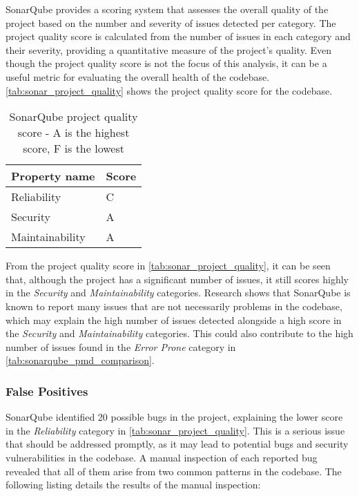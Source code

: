SonarQube provides a scoring system that assesses the overall quality of the project based on the number and severity of issues detected per category. The project quality score is calculated from the number of issues in each category and their severity, providing a quantitative measure of the project's quality. Even though the project quality score is not the focus of this analysis, it can be a useful metric for evaluating the overall health of the codebase. \autoref{tab:sonar_project_quality} shows the project quality score for the codebase.

\begin{table}[H]
	\label{tab:sonar_project_quality}
	\begin{center}
		\begin{tabular}[c]{l|l}
			\hline
			\multicolumn{1}{c|}{\textbf{Property name}} &
			\multicolumn{1}{c}{\textbf{Score}}              \\
			\hline
			Reliability                                 & C \\
			Security                                    & A \\
			Maintainability                             & A \\
			\hline
		\end{tabular}
	\end{center}
	\caption{SonarQube project quality score - A is the highest score, F is the lowest}
\end{table}

\noindent From the project quality score in \autoref{tab:sonar_project_quality}, it can be seen that, although the project has a significant number of issues, it still scores highly in the \textit{Security} and \textit{Maintainability} categories. Research shows that SonarQube is known to report many issues that are not necessarily problems in the codebase, which may explain the high number of issues detected alongside a high score in the \textit{Security} and \textit{Maintainability} categories. This could also contribute to the high number of issues found in the \textit{Error Prone} category in \autoref{tab:sonarqube_pmd_comparison}.

\subsubsection{False Positives}

SonarQube identified 20 possible bugs in the project, explaining the lower score in the \textit{Reliability} category in \autoref{tab:sonar_project_quality}. This is a serious issue that should be addressed promptly, as it may lead to potential bugs and security vulnerabilities in the codebase. A manual inspection of each reported bug revealed that all of them arise from two common patterns in the codebase. The following listing details the results of the manual inspection:

